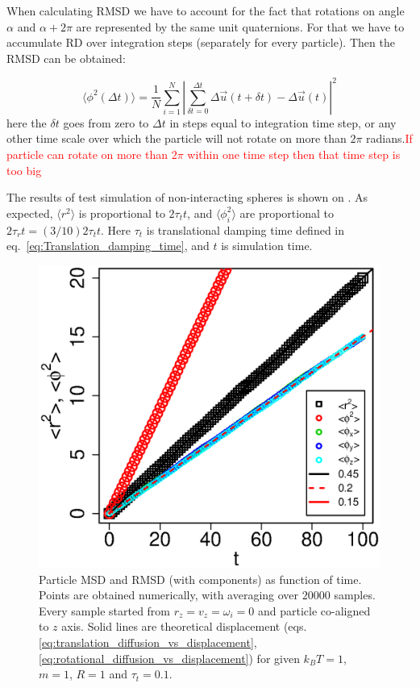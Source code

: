 When calculating RMSD we have to account for the fact that rotations on angle $
\alpha$ and $\alpha + 2\pi$ are represented by the same unit quaternions. For that we have to accumulate RD over integration steps (separately for every particle). Then the RMSD can be obtained:

\begin{equation}
\label{eq:rotational_mean_square_displacement}
	\langle \phi^2 (\Delta t)\rangle
		= \frac{1}{N} \sum_{i=1}^{N} 
			\left|
				\sum_{\delta t = 0}^{\Delta t}
					\Delta \vec{u}(t + \delta t) 
					- \Delta \vec{u}(t)
			\right|^2
\end{equation}
here the $\delta t$ goes from zero to $\Delta t$ in steps equal to integration time step, or any other time scale over which the particle will not rotate on more than $2 \pi$ radians.\textcolor{red}{If particle can rotate on more than $2 \pi$ within one time step then that time step is too big}

The results of test simulation of non-interacting spheres is shown on . As expected, $\langle r^2\rangle$ is proportional to $2 \tau_t t$, and $\langle \phi_i^2\rangle$ are proportional to $2 \tau_r t = (3/10) 2 \tau_t t$. Here $\tau_t$ is translational damping time defined in eq.~\eqref{eq:Translation_damping_time}, and $t$ is simulation time.

\begin{figure}[h]
\centering
	\includegraphics[height=0.3\textheight]{Images/DiffusionStats_drift}
	\captionsetup{justification=centering, width=0.9\textwidth}
	\caption{Particle MSD and RMSD (with components) as function of time. Points are obtained numerically, with averaging over $20000$ samples. Every sample started from $r_z = v_z = \omega_i = 0$ and particle co-aligned to $z$ axis. Solid lines are theoretical displacement (eqs. \eqref{eq:translation_diffusion_vs_displacement}, \eqref{eq:rotational_diffusion_vs_displacement}) for given $k_BT = 1$, $m = 1$, $R = 1$ and $\tau_t = 0.1$.}
	\label{fig:diffusion_stats_mean_square_displacement}
\end{figure}

